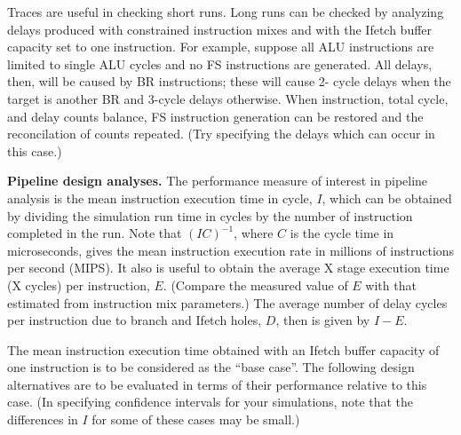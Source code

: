 Traces are useful in checking short runs. Long runs can be checked by
analyzing delays produced with constrained instruction mixes and with the
Ifetch buffer capacity set to one instruction. For example, suppose all ALU
instructions are limited to single ALU cycles and no FS instructions are generated.
All delays, then, will be caused by BR instructions; these will cause 2-
cycle delays when the target is another BR and 3-cycle delays otherwise.
When instruction, total cycle, and delay counts balance, FS instruction generation
can be restored and the reconcilation of counts repeated. (Try specifying
the delays which can occur in this case.)

\noindent\textbf{Pipeline design analyses.} The performance measure of interest in
pipeline analysis is the mean instruction execution time in cycle, $I$, which can
be obtained by dividing the simulation run time in cycles by the number of
instruction completed in the run. Note that $(IC)^{-1}$, where $C$ is the cycle time
in microseconds, gives the mean instruction execution rate in millions of
instructions per second (MIPS). It also is useful to obtain the average X stage
execution time (X cycles) per instruction, $E$. (Compare the measured value of
$E$ with that estimated from instruction mix parameters.) The average
number of delay cycles per instruction due to branch and Ifetch holes, $D$, then
is given by $I-E$.

The mean instruction execution time obtained with an Ifetch buffer
capacity of one instruction is to be considered as the ``base case''. The
following design alternatives are to be evaluated in terms of their performance
relative to this case. (In specifying confidence intervals for your simulations,
note that the differences in $I$ for some of these cases may be small.)

